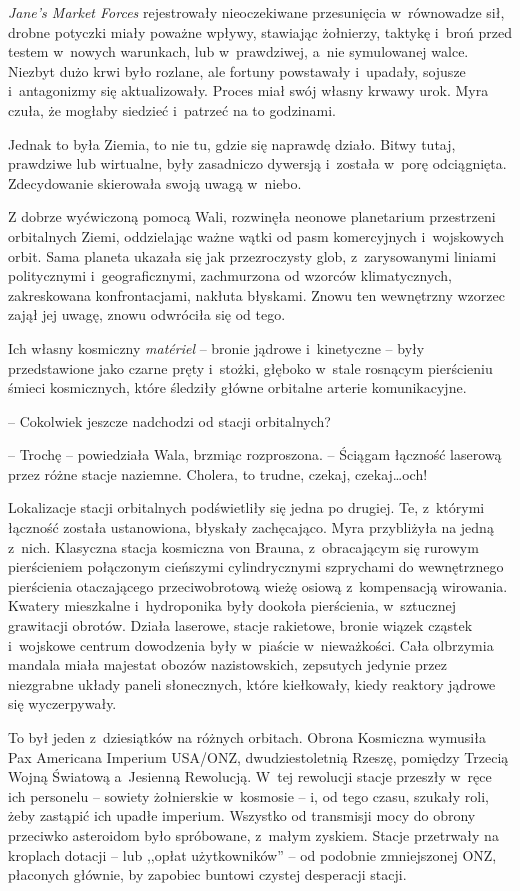\documentclass[oneside,polish,11pt,sfheadings]{mwbk}
\begin{document}
\textit{Jane's Market Forces} rejestrowały nieoczekiwane przesunięcia w~równowadze sił, drobne potyczki miały poważne wpływy, stawiając
żołnierzy, taktykę i~broń przed testem w~nowych warunkach, lub w~prawdziwej, a~nie symulowanej walce. Niezbyt dużo krwi było rozlane, ale
fortuny powstawały i~upadały, sojusze i~antagonizmy się aktualizowały.
Proces miał swój własny krwawy urok. Myra czuła, że mogłaby siedzieć i~patrzeć na to godzinami.

Jednak to była Ziemia, to nie tu, gdzie się naprawdę działo. Bitwy
tutaj, prawdziwe lub wirtualne, były zasadniczo dywersją i~została w~porę odciągnięta. Zdecydowanie skierowała swoją uwagą w~niebo.

Z dobrze wyćwiczoną pomocą Wali, rozwinęła neonowe planetarium
przestrzeni orbitalnych Ziemi, oddzielając ważne wątki od pasm
komercyjnych i~wojskowych orbit. Sama planeta ukazała się jak
przezroczysty glob, z~zarysowanymi liniami politycznymi i~geograficznymi, zachmurzona od wzorców klimatycznych, zakreskowana
konfrontacjami, nakłuta błyskami. Znowu ten wewnętrzny wzorzec zajął jej
uwagę, znowu odwróciła się od tego.

Ich własny kosmiczny \textit{matériel} -- bronie jądrowe i~kinetyczne -- były przedstawione jako czarne pręty i~stożki, głęboko w~stale rosnącym
pierścieniu śmieci kosmicznych, które śledziły główne orbitalne arterie
komunikacyjne.

-- Cokolwiek jeszcze nadchodzi od stacji orbitalnych?

-- Trochę -- powiedziała Wala, brzmiąc rozproszona. -- Ściągam łączność
laserową przez różne stacje naziemne. Cholera, to trudne, czekaj,
czekaj\ldots och!

Lokalizacje stacji orbitalnych podświetliły się jedna po drugiej. Te, z~którymi łączność została ustanowiona, błyskały zachęcająco. Myra
przybliżyła na jedną z~nich. Klasyczna stacja kosmiczna von Brauna, z~obracającym się rurowym pierścieniem połączonym cieńszymi cylindrycznymi
szprychami do wewnętrznego pierścienia otaczającego przeciwobrotową
wieżę osiową z~kompensacją wirowania. Kwatery mieszkalne i~hydroponika
były dookoła pierścienia, w~sztucznej grawitacji obrotów. Działa
laserowe, stacje rakietowe, bronie wiązek cząstek i~wojskowe centrum
dowodzenia były w~piaście w~nieważkości. Cała olbrzymia mandala miała
majestat obozów nazistowskich, zepsutych jedynie przez niezgrabne układy
paneli słonecznych, które kiełkowały, kiedy reaktory jądrowe się
wyczerpywały.

To był jeden z~dziesiątków na różnych orbitach. Obrona Kosmiczna
wymusiła Pax Americana Imperium USA/ONZ, dwudziestoletnią Rzeszę,
pomiędzy Trzecią Wojną Światową a~Jesienną Rewolucją. W~tej rewolucji
stacje przeszły w~ręce ich personelu -- sowiety żołnierskie w~kosmosie -- i, od tego czasu, szukały roli, żeby zastąpić ich upadłe imperium.
Wszystko od transmisji mocy do obrony przeciwko asteroidom było
spróbowane, z~małym zyskiem. Stacje przetrwały na kroplach dotacji -- lub
,,opłat użytkowników'' -- od podobnie zmniejszonej ONZ, płaconych
głównie, by zapobiec buntowi czystej desperacji stacji.
\end{document}

